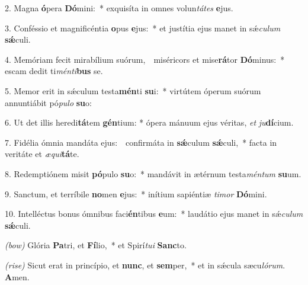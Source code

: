 2. Magna \textbf{ó}pera \textbf{Dó}mini:~*
	exquisíta in omnes volun\textit{tá}\textit{tes} \textbf{e}jus.

3. Conféssio et magnificéntia \textbf{o}pus \textbf{e}jus:~*
	et justítia ejus manet in s\'{\ae}\textit{cu}\textit{lum} \textbf{s\'{\ae}}culi.

4. Memóriam fecit mirabílium suórum,~\GreDagger\
	miséricors et mise\textbf{rá}tor \textbf{Dó}minus:~*
	escam dedit ti\textit{mén}\textit{ti}\textbf{bus} se.

5. Memor erit in s\'{\ae}culum testa\textbf{mén}ti \textbf{su}i:~*
	virtútem óperum suórum annuntiábit pó\textit{pu}\textit{lo} \textbf{su}o:

6. Ut det illis heredi\textbf{tá}tem \textbf{gén}tium: *
	ópera mánuum ejus véritas, \textit{et} \textit{ju}\textbf{dí}\-cium.

7. Fidélia ómnia mandáta ejus:~\GreDagger\
	confirmáta in \textbf{s\'{\ae}}culum \textbf{s\'{\ae}}culi,~*
	facta in veritáte et \textit{æ}\textit{qui}\textbf{tá}te.

8. Redemptiónem misit \textbf{pó}pulo \textbf{su}o:~*
	mandávit in ætérnum testa\textit{mén}\textit{tum} \textbf{su}um.

9. Sanctum, et terríbile \textbf{no}men \textbf{e}jus:~*
	inítium sapiéntiæ \textit{ti}\textit{mor} \textbf{Dó}\-mini.

10. Intelléctus bonus ómnibus faci\textbf{én}tibus \textbf{e}um:~*
	laudátio ejus manet in s\'{\ae}\textit{cu}\textit{lum} \textbf{s\'{\ae}}culi.

\textit{(bow)} Glória \textbf{Pa}tri, et \textbf{Fí}lio,~*
	et Spirí\textit{tu}\textit{i} \textbf{Sanc}to.

\textit{(rise)} Sicut erat in princípio, et \textbf{nunc}, et \textbf{sem}per,~*
	et in s\'{\ae}cula sæcu\textit{ló}\textit{rum}. \textbf{A}men.
